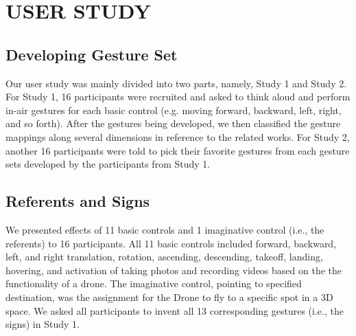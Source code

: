 \documentclass{sigchi}
\begin{document}


\section{USER STUDY}

\subsection{Developing Gesture Set}

Our user study was mainly divided into two parts, namely, Study 1 and Study 2. For Study 1, 16 participants were recruited and asked to think aloud and perform in-air gestures for each basic control (e.g. moving forward, backward, left, right, and so forth). After the gestures being developed, we then classified the gesture mappings along several dimensions in reference to the related works. For Study 2, another 16 participants were told to pick their favorite gestures from each gesture sets developed by the participants from Study 1.


\subsection{Referents and Signs}

We presented effects of 11 basic controls and 1 imaginative control (i.e., the referents) to 16 participants. All 11 basic controls included forward, backward, left, and right translation, rotation, ascending, descending, takeoff, landing, hovering, and activation of taking photos and recording videos based on the the functionality of a drone. The imaginative control, pointing to specified destination, was the assignment for the Drone to fly to a specific spot in a 3D space. We asked all participants to invent all 13 corresponding gestures (i.e., the signs) in Study 1.
\end{document}
